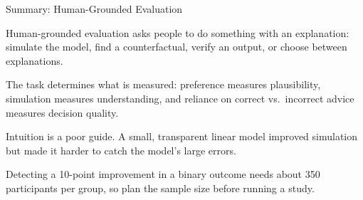 \documentclass[10pt,compress,t,notes=noshow, xcolor=table, handout]{beamer}
\begin{document}
\begin{framev}[align=mid]{Summary: Human-Grounded Evaluation}
\begin{itemizeM}
\item Human-grounded evaluation asks people to do something with an explanation: simulate the model, find a counterfactual, verify an output, or choose between explanations.
\item The task determines what is measured: preference measures plausibility, simulation measures understanding, and reliance on correct vs.\ incorrect advice measures decision quality.
\item Intuition is a poor guide. A small, transparent linear model improved simulation but made it harder to catch the model's large errors.
\item Detecting a 10-point improvement in a binary outcome needs about 350 participants per group, so plan the sample size before running a study.
\end{itemizeM}
\end{framev}


\endlecture
\end{document}
